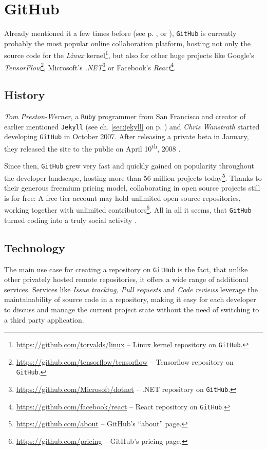\section{GitHub}
\label{sec:git-github}

Already mentioned it a few times before (see p. \pageref{sec:jekyll}, \pageref{sec:buildpipelines-markdown} or \pageref{sec:git}), \texttt{GitHub} is currently probably the most popular online collaboration platform, hosting not only the source code for the \emph{Linux} kernel\footnote{\url{https://github.com/torvalds/linux} -- Linux kernel repository on \texttt{GitHub}.}, but also for other huge projects like Google's \emph{TensorFlow}\footnote{\url{https://github.com/tensorflow/tensorflow} -- Tensorflow repository on \texttt{GitHub}.}, Microsoft's \emph{.NET}\footnote{\url{https://github.com/Microsoft/dotnet} -- .NET repository on \texttt{GitHub}.} or Facebook's \emph{React}\footnote{\url{https://github.com/facebook/react} -- React repository on \texttt{GitHub}.}.

\subsection{History}
\emph{Tom Preston-Werner}, a \texttt{Ruby} programmer from San Francisco and creator of earlier mentioned \texttt{Jekyll} (see ch. \ref{sec:jekyll} on p. \pageref{sec:jekyll}) and \emph{Chris Wanstrath} started developing \texttt{GitHub} in October 2007. After releasing a private beta in January, they released the site to the public on April 10\textsuperscript{th}, 2008 \cite{PrestonWerner2008githublaunch}.

Since then, \texttt{GitHub} grew very fast and quickly gained on popularity throughout the developer landscape, hosting more than 56 million projects today\footnote{\url{https://github.com/about} -- GitHub's ``about'' page.}. Thanks to their generous freemium pricing model, collaborating in open source projects still is for free: A free tier account may hold unlimited open source repositories, working together with unlimited contributors\footnote{\url{https://github.com/pricing} -- GitHub's pricing page.}. All in all it seems, that \texttt{GitHub} turned coding into a truly social activity \cite[416]{loeliger2012version}.

\subsection{Technology}
The main use case for creating a repository on \texttt{GitHub} is the fact, that unlike other privately hosted remote repositories, it offers a wide range of additional services. Services like \emph{Issue tracking, Pull requests} and \emph{Code reviews} leverage the maintainability of source code in a repository, making it easy for each developer to discuss and manage the current project state without the need of switching to a third party application.

